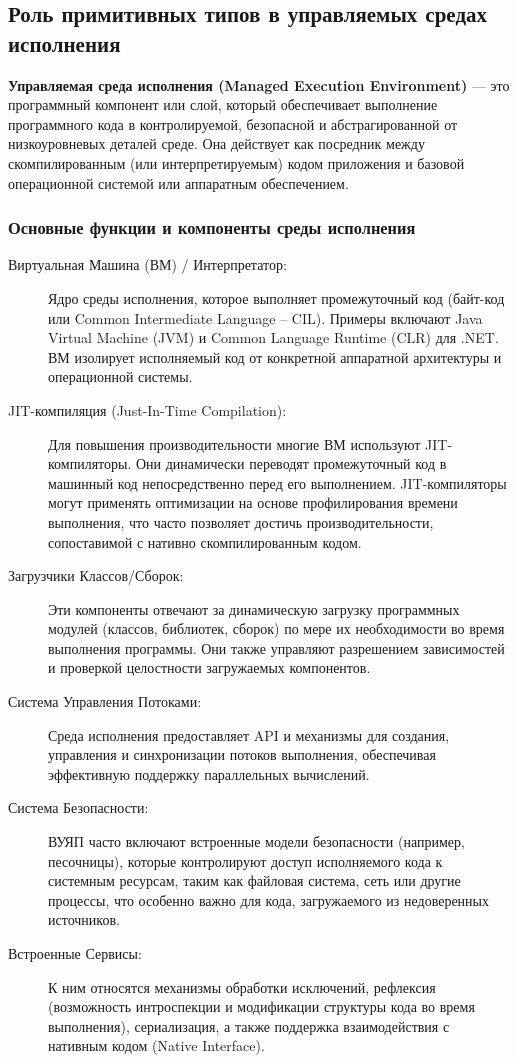 \subsection{Роль примитивных типов в управляемых средах исполнения}

\textbf{ Управляемая среда исполнения (Managed Execution Environment)} — это программный компонент или слой, который обеспечивает выполнение программного кода в контролируемой,
безопасной и абстрагированной от низкоуровневых деталей среде. Она действует как посредник между скомпилированным (или интерпретируемым) кодом приложения и базовой операционной
системой или аппаратным обеспечением.

\subsubsection{Основные функции и компоненты среды исполнения}

\begin{description}

    \item[Виртуальная Машина (ВМ) / Интерпретатор:]
    Ядро среды исполнения, которое выполняет промежуточный код (байт-код или Common Intermediate Language – CIL). Примеры включают Java Virtual Machine (JVM) и Common Language Runtime (CLR) для .NET. ВМ изолирует исполняемый код от конкретной аппаратной архитектуры и операционной системы.
    \item[JIT-компиляция (Just-In-Time Compilation):]
    Для повышения производительности многие ВМ используют JIT-компиляторы. Они динамически переводят промежуточный код в машинный код непосредственно перед его выполнением. JIT-компиляторы могут применять оптимизации на основе профилирования времени выполнения, что часто позволяет достичь производительности, сопоставимой с нативно скомпилированным кодом.
    \item[Загрузчики Классов/Сборок:]
    Эти компоненты отвечают за динамическую загрузку программных модулей (классов, библиотек, сборок) по мере их необходимости во время выполнения программы. Они также управляют разрешением зависимостей и проверкой целостности загружаемых компонентов.
    \item[Система Управления Потоками:]
    Среда исполнения предоставляет API и механизмы для создания, управления и синхронизации потоков выполнения, обеспечивая эффективную поддержку параллельных вычислений.
    \item[Система Безопасности:]
    ВУЯП часто включают встроенные модели безопасности (например, песочницы), которые контролируют доступ исполняемого кода к системным ресурсам, таким как файловая система, сеть или другие процессы, что особенно важно для кода, загружаемого из недоверенных источников.
    \item[Встроенные Сервисы:]
    К ним относятся механизмы обработки исключений, рефлексия (возможность интроспекции и модификации структуры кода во время выполнения), сериализация, а также поддержка взаимодействия с нативным кодом (Native Interface).
\end{description}

